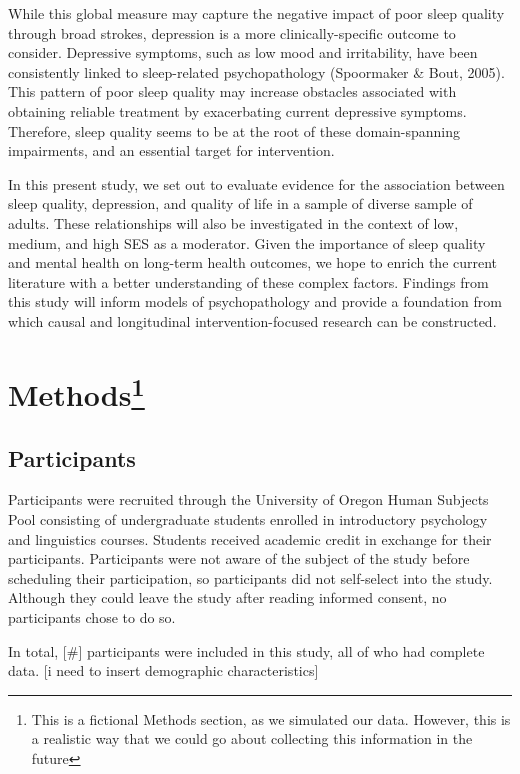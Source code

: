 \documentclass[man]{apa6}
\let\rmarkdownfootnote\footnote%
\def\footnote{\protect\rmarkdownfootnote}
\theoremstyle{definition}
\theoremstyle{definition}
\theoremstyle{definition}
\theoremstyle{remark}
\begin{document}
While this global measure may capture the negative impact of poor sleep
quality through broad strokes, depression is a more clinically-specific
outcome to consider. Depressive symptoms, such as low mood and
irritability, have been consistently linked to sleep-related
psychopathology (Spoormaker \& Bout, 2005). This pattern of poor sleep
quality may increase obstacles associated with obtaining reliable
treatment by exacerbating current depressive symptoms. Therefore, sleep
quality seems to be at the root of these domain-spanning impairments,
and an essential target for intervention.

In this present study, we set out to evaluate evidence for the
association between sleep quality, depression, and quality of life in a
sample of diverse sample of adults. These relationships will also be
investigated in the context of low, medium, and high SES as a moderator.
Given the importance of sleep quality and mental health on long-term
health outcomes, we hope to enrich the current literature with a better
understanding of these complex factors. Findings from this study will
inform models of psychopathology and provide a foundation from which
causal and longitudinal intervention-focused research can be
constructed.

\section{\texorpdfstring{Methods\footnote{This is a fictional Methods section, as we simulated our data. However, this is a realistic way that we could go about collecting this information in the future}}{Methods}}\label{methods}

\subsection{Participants}\label{participants}

Participants were recruited through the University of Oregon Human
Subjects Pool consisting of undergraduate students enrolled in
introductory psychology and linguistics courses. Students received
academic credit in exchange for their participants. Participants were
not aware of the subject of the study before scheduling their
participation, so participants did not self-select into the study.
Although they could leave the study after reading informed consent, no
participants chose to do so.

In total, {[}\#{]} participants were included in this study, all of who
had complete data. {[}i need to insert demographic characteristics{]}
\end{document}
